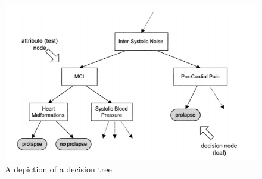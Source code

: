\begin{figure}[H]
    \caption{A depiction of a decision tree}
    \centerline{\includegraphics[scale=.4]{fig_decision_tree.png}}
    \label{fig:decision-tree}
\end{figure}

%


%
%

